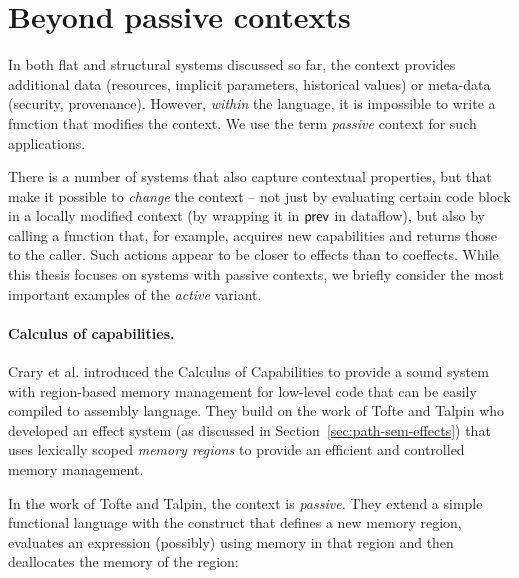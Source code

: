 
\section{Beyond passive contexts}

In both flat and structural systems discussed so far, the context provides additional data (resources,
implicit parameters, historical values) or meta-data (security, provenance). However, \emph{within}
the language, it is impossible to write a function that modifies the context. We use the term
\emph{passive} context for such applications.

There is a number of systems that also capture contextual properties, but that make it possible to
\emph{change} the context -- not just by evaluating certain code block in a locally modified context
(\eg by wrapping it in $\textnormal{\sffamily prev}$ in dataflow), but also by calling a function that, for example,
acquires new capabilities and returns those to the caller. Such actions appear to be closer to
effects than to coeffects. While this thesis focuses on systems with passive contexts, we briefly
consider the most important examples of the \emph{active} variant.


\paragraph{Calculus of capabilities.}
\label{sec:applications-active-ccc}

Crary et al. \cite{app-capabilities} introduced the Calculus of Capabilities to provide
a sound system with region-based memory management for low-level code that can be easily
compiled to assembly language. They build on the work of Tofte and Talpin \cite{app-region-memory}
who developed an effect system (as discussed in Section~\ref{sec:path-sem-effects}) that uses
lexically scoped \emph{memory regions} to provide an efficient and controlled memory management.

In the work of Tofte and Talpin, the context is \emph{passive}. They extend a simple functional language
with the  construct that defines a new memory region, evaluates an expression (possibly)
using memory in that region and then deallocates the memory of the region:

